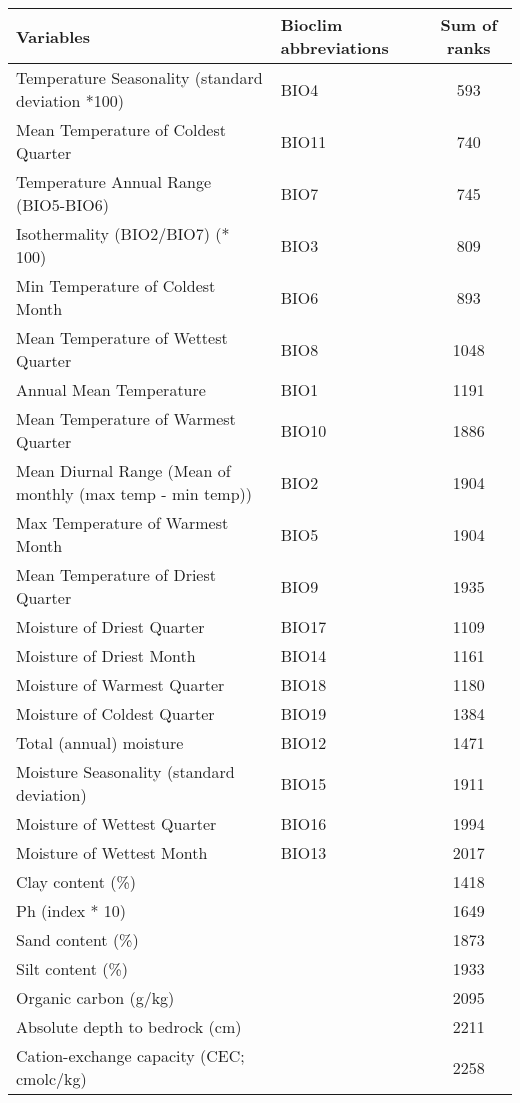 \documentclass[12pt,a4paper]{article}
\begin{document}
\begin{tabular}{llc}
  \hline
Variables & Bioclim abbreviations & Sum of ranks \\ 
  \hline
Temperature Seasonality (standard deviation *100) & BIO4 & 593 \\ 
  Mean Temperature of Coldest Quarter & BIO11 & 740 \\ 
  Temperature Annual Range (BIO5-BIO6) & BIO7 & 745 \\ 
  Isothermality (BIO2/BIO7) (* 100) & BIO3 & 809 \\ 
  Min Temperature of Coldest Month & BIO6 & 893 \\ 
  Mean Temperature of Wettest Quarter & BIO8 & 1048 \\ 
  Annual Mean Temperature & BIO1 & 1191 \\ 
  Mean Temperature of Warmest Quarter & BIO10 & 1886 \\ 
  Mean Diurnal Range (Mean of monthly (max temp - min temp)) & BIO2 & 1904 \\ 
  Max Temperature of Warmest Month & BIO5 & 1904 \\ 
  Mean Temperature of Driest Quarter & BIO9 & 1935 \\ 
   \hline
Moisture of Driest Quarter & BIO17 & 1109 \\ 
  Moisture of Driest Month & BIO14 & 1161 \\ 
  Moisture of Warmest Quarter & BIO18 & 1180 \\ 
  Moisture of Coldest Quarter & BIO19 & 1384 \\ 
  Total (annual) moisture & BIO12 & 1471 \\ 
  Moisture Seasonality (standard deviation) & BIO15 & 1911 \\ 
  Moisture of Wettest Quarter & BIO16 & 1994 \\ 
  Moisture of Wettest Month & BIO13 & 2017 \\ 
   \hline
Clay content (\%) &  & 1418 \\ 
  Ph (index * 10) &  & 1649 \\ 
  Sand content (\%) &  & 1873 \\ 
  Silt content (\%) &  & 1933 \\ 
  Organic carbon (g/kg) &  & 2095 \\ 
  Absolute depth to bedrock (cm) &  & 2211 \\ 
  Cation-exchange capacity (CEC; cmolc/kg) &  & 2258 \\ 
   \hline
\end{tabular}
\end{document}
